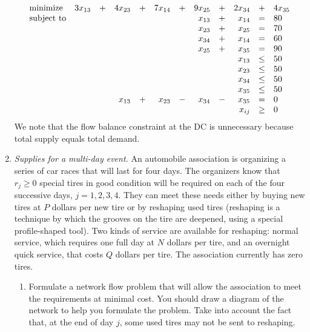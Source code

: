 \begin{enumerate}
\begin{solution}
\[
\begin{array}{lrrrrrrrrrrl}
\textrm{minimize} & 3x_{13} &+& 4x_{23} &+& 7x_{14} &+& 9x_{25} &+& 2x_{34} &+& 4x_{35} \\
\textrm{subject to} &&&&&&& x_{13} &+& x_{14} &=& 80\\
&&&&&&& x_{23} &+& x_{25} &=& 70\\
&&&&&&& x_{34} &+& x_{14} &=& 60\\
&&&&&&& x_{25} &+& x_{35} &=& 90\\
&&&&&&&&& x_{13} & \leq & 50\\
&&&&&&&&& x_{23} & \leq & 50\\
&&&&&&&&& x_{34} & \leq & 50\\
&&&&&&&&& x_{35} & \leq & 50\\
&&& x_{13} &+& x_{23} &-& x_{34} &-& x_{35} &=& 0\\
\multicolumn{10}{r}{x_{ij}} & \geq & 0
\end{array}
\]
We note that the flow balance constraint at the DC is unnecessary
because total supply equals total demand.
\end{solution}

\item \emph{Supplies for a multi-day event.}  An automobile
  association is organizing a series of car races that will last for
  four days. The organizers know that $r_j \geq 0$ special tires in
  good condition will be required on each of the four successive days,
  $j = 1, 2, 3, 4$. They can meet these needs either by buying new
  tires at $P$ dollars per new tire or by reshaping used tires
  (reshaping is a technique by which the grooves on the tire are
  deepened, using a special profile-shaped tool). Two kinds of service
  are available for reshaping: normal service, which requires one full
  day at $N$ dollars per tire, and an overnight quick service, that
  costs $Q$ dollars per tire. The association currently has zero
  tires.

\begin{enumerate}
\item  Formulate a network flow problem that will allow the association to
  meet the requirements at minimal cost. You should draw a diagram of
  the network to help you formulate the problem. Take into account the
  fact that, at the end of day $j$, some used tires may not be sent to
  reshaping.


\end{enumerate}
\end{enumerate}
